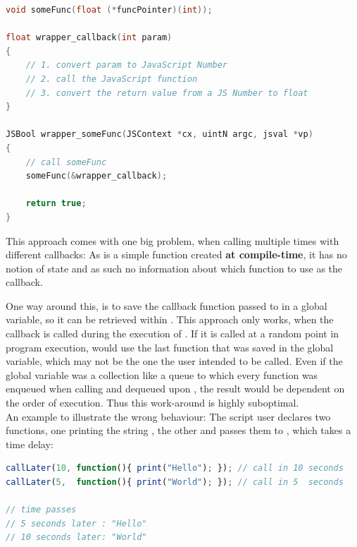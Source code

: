 \SingleSpacing
\begin{lstlisting}[language=C++, caption=Wrapper code for handling methods that take function pointers \#1]
void someFunc(float (*funcPointer)(int));

float wrapper_callback(int param)
{
	// 1. convert param to JavaScript Number
	// 2. call the JavaScript function
	// 3. convert the return value from a JS Number to float
}

JSBool wrapper_someFunc(JSContext *cx, uintN argc, jsval *vp)
{
	// call someFunc
	someFunc(&wrapper_callback);
	
	return true;
}
\end{lstlisting}
\OnehalfSpacing

This approach comes with one big problem, when calling  multiple times with different  callbacks: As  is a simple  function created \textbf{at compile-time}, it has no notion of state and as such no information about which  function to use as the callback.

One way around this, is to save the  callback function passed to \linebreak{} in a global variable, so it can be retrieved within . This approach only works, when the callback is called during the execution of . If it is called at a random point in program execution,  would use the last  function that was saved in the global variable, which may not be the one the user intended to be called. Even if the global variable was a collection like a queue to which every  function was enqueued when calling  and dequeued upon , the result would be dependent on the order of execution. Thus this work-around is highly suboptimal.\\
An example to illustrate the wrong behaviour: The script user declares two  functions, one printing the string , the other  and passes them to \linebreak{}, which takes a time delay:

\SingleSpacing
\begin{lstlisting}[language=JavaScript, caption=Passing a callback function]
callLater(10, function(){ print("Hello"); }); // call in 10 seconds
callLater(5,  function(){ print("World"); }); // call in 5  seconds

// time passes
// 5 seconds later : "Hello"
// 10 seconds later: "World"
\end{lstlisting}
\OnehalfSpacing

